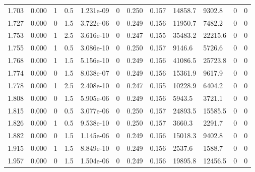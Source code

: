 \documentclass[preview]{standalone}
\begin{document}
{{{\begin{tabular}{L{1.2cm}C{1.2cm} C{0.3cm}C{0.5cm} C{1.4cm}C{1.4cm} C{1.4cm}C{1.4cm} C{1.6cm}C{1.6cm} C{1.6cm}C{1.6cm}}
  1.703  &  0.000  & 1     & 0.5 &  1.231e-09  & 0  &  0.250&   0.157& 14858.7 & 9302.8   &  0 & 0  \\ 
  1.727  &  0.000  & 0     & 1.5 &  3.722e-06  & 0  &  0.249&   0.156& 11950.7 & 7482.2   &  0 & 0  \\ 
  1.753  &  0.000  & 1     & 2.5 &  3.616e-10  & 0  &  0.247&   0.155& 35483.2 & 22215.6   &  0 & 0  \\ 
  1.755  &  0.000  & 1     & 0.5 &  3.086e-10  & 0  &  0.250&   0.157& 9146.6 & 5726.6   &  0 & 0  \\ 
  1.768  &  0.000  & 1     & 1.5 &  5.156e-10  & 0  &  0.249&   0.156& 41086.5 & 25723.8   &  0 & 0  \\ 
  1.774  &  0.000  & 0     & 1.5 &  8.038e-07  & 0  &  0.249&   0.156& 15361.9 & 9617.9   &  0 & 0  \\ 
  1.778  &  0.000  & 1     & 2.5 &  2.408e-10  & 0  &  0.247&   0.155& 10228.9 & 6404.2   &  0 & 0  \\ 
  1.808  &  0.000  & 0     & 1.5 &  5.905e-06  & 0  &  0.249&   0.156& 5943.5 & 3721.1   &  0 & 0  \\ 
  1.815  &  0.000  & 0     & 0.5 &  3.077e-06  & 0  &  0.250&   0.157& 24893.5 & 15585.5   &  0 & 0  \\ 
  1.826  &  0.000  & 1     & 0.5 &  9.538e-10  & 0  &  0.250&   0.157& 3660.3 & 2291.7   &  0 & 0  \\ 
  1.882  &  0.000  & 0     & 1.5 &  1.145e-06  & 0  &  0.249&   0.156& 15018.3 & 9402.8   &  0 & 0  \\ 
  1.915  &  0.000  & 1     & 1.5 &  8.849e-10  & 0  &  0.249&   0.156& 2537.6 & 1588.7   &  0 & 0  \\ 
  1.957  &  0.000  & 0     & 1.5 &  1.504e-06  & 0  &  0.249&   0.156& 19895.8 & 12456.5   &  0 & 0  \\ 
\hline 
\end{tabular} 

}}}
\end{document}
